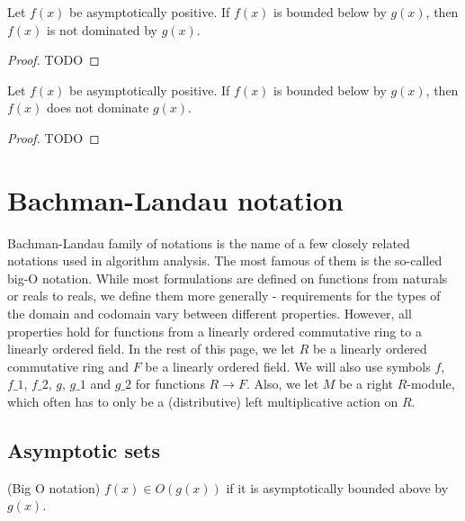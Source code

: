 \begin{lemma}
    \label{thm:asymp_bounded_below_imp_not_right_dom}
    \leanok
    Let $f(x)$ be asymptotically positive. If $f(x)$ is bounded below by $g(x)$, then $f(x)$ 
    is not dominated by $g(x)$.
\end{lemma}

\begin{proof}
    TODO 
\end{proof}

\begin{lemma}
    \label{thm:asymp_bounded_above_imp_not_left_dom}
    \leanok
    Let $f(x)$ be asymptotically positive. If $f(x)$ is bounded below by $g(x)$, then $f(x)$ 
    does not dominate $g(x)$.
\end{lemma}

\begin{proof}
    TODO 
\end{proof}


\section{Bachman-Landau notation}

Bachman-Landau family of notations is the name of a few closely related notations used in 
algorithm analysis. The most famous of them is the so-called big-O notation. While
most formulations are defined on functions from naturals or reals to reals, we define 
them more generally - requirements for the types of the domain and codomain vary between 
different properties. However, all properties hold for functions from a linearly ordered 
commutative ring to a linearly ordered field. In the rest of this page, we let $R$ be a linearly 
ordered commutative ring and $F$ be a linearly ordered field. We will also use symbols $f$, 
$f\_1$, $f\_2$, $g$, $g\_1$ and $g\_2$ for functions $R \to F$. Also, we let $M$ be 
a right $R$-module, which often has to only be a (distributive) left multiplicative action
on $R$.


\subsection{Asymptotic sets}

\begin{definition}(Big O notation)
    \label{def:big_o}
    \leanok
    $f(x) \in O(g(x))$ if it is asymptotically bounded above by $g(x)$.
\end{definition}

